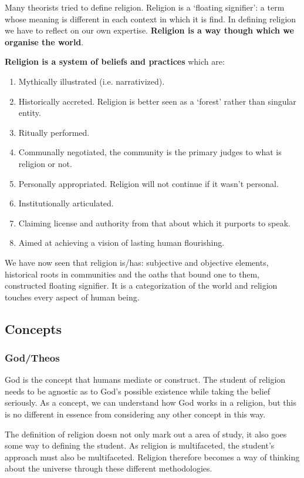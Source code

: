 \documentclass{article}
\begin{document}
Many theorists tried to define religion. Religion is a `floating signifier': a term whose meaning is different in each context in which it is find. In defining religion we have to reflect on our own expertise. \textbf{Religion is a way though which we organise the world}.

\textbf{Religion is a system of beliefs and practices} which are:

\begin{enumerate}
  \item Mythically illustrated (i.e. narrativized).
  \item Historically accreted. Religion is better seen as a `forest' rather than singular entity.
  \item Ritually performed.
  \item Communally negotiated, the community is the primary judges to what is religion or not.
  \item Personally appropriated. Religion will not continue if it wasn't personal.
  \item Institutionally articulated.
  \item Claiming license and authority from that about which it purports to speak.
  \item Aimed at achieving a vision of lasting human flourishing.
\end{enumerate}

We have now seen that religion is/has: subjective and objective elements, historical roots in communities and the oaths that bound one to them, constructed floating signifier. It is a categorization of the world and religion touches every aspect of human being.

\subsection{Concepts}

\subsubsection{God/Theos}

God is the concept that humans mediate or construct. The student of religion needs to be agnostic as to God's possible existence while taking the belief seriously. As a concept, we can understand how God works in a religion, but this is no different in essence from considering any other concept in this way.

The definition of religion doesn not only mark out a area of study, it also goes some way to defining the student. As religion is multifaceted, the student's approach must also be multifaceted. Religion therefore becomes a way of thinking about the universe through these different methodologies.
\end{document}
